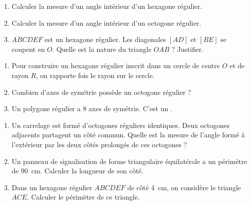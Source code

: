 \documentclass[11pt]{article}
\begin{document}
\begin{exercice}
\begin{enumerate}
    \item Calculer la mesure d'un angle intérieur d'un hexagone régulier.
    \item Calculer la mesure d'un angle intérieur d'un octogone régulier.
    \item $ABCDEF$ est un hexagone régulier. Les diagonales $[AD]$ et $[BE]$ se coupent en $O$. Quelle est la nature du triangle $OAB$ ? Justifier.
\end{enumerate}
\end{exercice}

\begin{exercice}
\begin{enumerate}
    \item Pour construire un hexagone régulier inscrit dans un cercle de centre $O$ et de rayon $R$, on rapporte \underline{\hspace{4cm}} fois le rayon sur le cercle.
    \item Combien d'axes de symétrie possède un octogone régulier ?
    \item Un polygone régulier a 8 axes de symétrie. C'est un \underline{\hspace{3cm}}.
\end{enumerate}
\end{exercice}

\begin{exercice}
\begin{enumerate}
    \item Un carrelage est formé d'octogones réguliers identiques. Deux octogones adjacents partagent un côté commun. Quelle est la mesure de l'angle formé à l'extérieur par les deux côtés prolongés de ces octogones ?
    \item Un panneau de signalisation de forme triangulaire équilatérale a un périmètre de \SI{90}{cm}. Calculer la longueur de son côté.
    \item Dans un hexagone régulier $ABCDEF$ de côté \SI{4}{cm}, on considère le triangle $ACE$. Calculer le périmètre de ce triangle.
\end{enumerate}
\end{exercice}
\end{document}
